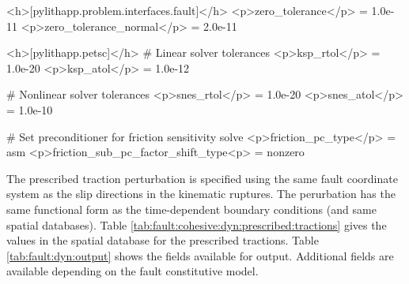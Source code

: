 

\begin{cfg}
<h>[pylithapp.problem.interfaces.fault]</h>
<p>zero_tolerance</p> = 1.0e-11
<p>zero_tolerance_normal</p> = 2.0e-11

<h>[pylithapp.petsc]</h>
# Linear solver tolerances
<p>ksp_rtol</p> = 1.0e-20
<p>ksp_atol</p> = 1.0e-12

# Nonlinear solver tolerances
<p>snes_rtol</p> = 1.0e-20
<p>snes_atol</p> = 1.0e-10

# Set preconditioner for friction sensitivity solve
<p>friction_pc_type</p> = asm
<p>friction_sub_pc_factor_shift_type<p> = nonzero
\end{cfg}

The prescribed traction perturbation is specified using the same fault
coordinate system as the slip directions in the kinematic ruptures.
The perurbation has the same functional form as the time-dependent
boundary conditions (and same spatial databases). Table
\vref{tab:fault:cohesive:dyn:prescribed:tractions} gives the values in
the spatial database for the prescribed tractions.  Table
\vref{tab:fault:dyn:output} shows the fields available for output.
Additional fields are available depending on the fault constitutive
model.

